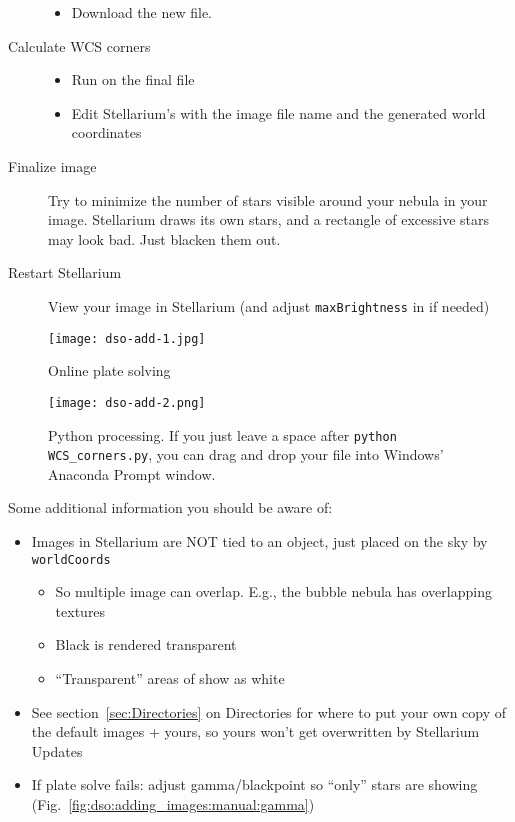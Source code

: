 \begin{description}
\begin{itemize}
  \item Download the new  file.
  \end{itemize}
\item[Calculate WCS corners]\mbox{}
  \begin{itemize}
  \item Run  on the final  file
  \item Edit Stellarium's  with the image file name and the generated world coordinates
  \end{itemize}
\item[Finalize image]
  Try to minimize the number of stars visible around your nebula in your image. Stellarium draws its own stars, and a rectangle of excessive stars may look bad. Just blacken them out. 
\item[Restart Stellarium]
  View your image in Stellarium (and adjust \texttt{maxBrightness} in  if needed)
\end{description}

\begin{figure}[htbp]
\centering\texttt{[image: dso-add-1.jpg]}
\caption{Online plate solving}
\label{fig:dso:adding_images:manual:plate-solving}
\end{figure}
\begin{figure}[htbp]
\centering\texttt{[image: dso-add-2.png]}
\caption{Python processing. If you just leave a space after \texttt{python WCS\_corners.py},
you can drag and drop your  file into Windows' Anaconda Prompt window.}
\label{fig:dso:adding_images:manual:python}
\end{figure}

\newpage
Some additional information you should be aware of:
\begin{itemize}
\item Images in Stellarium are NOT tied to an object, just placed on the sky by \texttt{worldCoords}
  \begin{itemize}
  \item So multiple image can overlap. E.g., the bubble nebula has overlapping textures 
  \item Black is rendered transparent
  \item ``Transparent'' areas of  show as white
  \end{itemize}
\item See section~\ref{sec:Directories} on Directories for where to put your own copy of the default images + yours, so yours won’t get overwritten by Stellarium Updates
\item If plate solve fails: adjust gamma/blackpoint so ``only'' stars are showing (Fig.~\ref{fig:dso:adding_images:manual:gamma})
\end{itemize}

